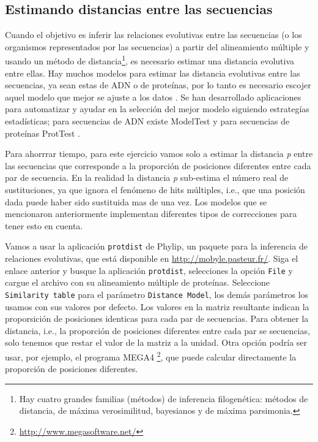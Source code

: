 \documentclass[letter,11pt]{book}
\begin{document}
\subsection{Estimando distancias entre las secuencias}
Cuando el objetivo es inferir las relaciones evolutivas entre las secuencias (o los organismos representados por las secuencias) a partir del alineamiento múltiple y usando un método de distancia\footnote{Hay cuatro grandes familias (métodos) de inferencia filogenética: métodos de distancia, de máxima verosimilitud, bayesianos y de máxima parsimonia.}, es necesario estimar una distancia evolutiva entre ellas. Hay muchos modelos para estimar las distancia evolutivas entre las secuencias, ya sean estas de ADN o de proteínas, por lo tanto es necesario escojer aquel modelo que mejor se ajuste a los datos \citep{Posada2001,Sullivan2005}. Se han desarrollado aplicaciones para automatizar y ayudar en la selección del mejor modelo siguiendo estrategías estadísticas; para secuencias de ADN existe {\sc ModelTest} \citep{Posada1998,Posada2006} y para secuencias de proteínas {\sc ProtTest} \citep{Abascal2005}.
  
Para ahorrrar tiempo, para este ejercicio vamos solo a estimar la distancia \textit{p} entre las secuencias que corresponde a la proporción de posiciones diferentes entre cada par de secuencia. En la realidad la distancia \textit{p} sub-estima el número real de sustituciones, ya que ignora el fenómeno de hits múltiples, i.e., que una posición dada puede haber sido sustituida mas de una vez. Los modelos que se mencionaron anteriormente implementan diferentes tipos de correcciones para tener esto en cuenta.
 
Vamos a usar la aplicación \Verb+protdist+ de {\sc Phylip}, un paquete para la inferencia de relaciones evolutivas, que está disponible en \url{http://mobyle.pasteur.fr/}. Siga el enlace anterior y busque la aplicación  \Verb+protdist+, selecciones la opción \Verb+File+ y cargue el archivo con su alineamiento múltiple de proteínas. Seleccione \Verb+Similarity table+ para el parámetro \Verb+Distance Model+, los demás parámetros los usamos con sus valores por defecto. Los valores en la matriz resultante indican la proporsición de posiciones identicas para cada par de secuencias. Para obtener la distancia, i.e., la proporción de posiciones diferentes entre cada par se secuencias, solo tenemos que restar el valor de la matriz a la unidad. Otra opción podría ser usar, por ejemplo, el programa MEGA4 \citep{Tamura2007}\footnote{\url{http://www.megasoftware.net/}}, que puede calcular directamente la proporción de posiciones diferentes.
\end{document}
